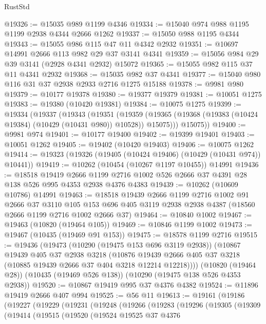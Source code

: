 \begin{lexlean}{RustStd}
\begin{coremodule}
{\begin{coremodule}
{{{{{{{{{{{{{{{{{{{{{{{{{{{{{{{{{{{{{{{{{{{{{{{{{{{{{{{{{{{{{{{{{{{{{{{{{{{{{{@19326 := @15035 @989 @1199 @4346
@19334 := @15040 @974 @988 @1195 @1199 @2938 @4344 @2666 @1262
@19337 := @15050 @988 @1195 @4344
@19343 := @15055 @986 @115 @47 @11 @4342 @2932
@19351 := @10697 @14991 @2666 @113 @982 @29 @37 @3141 @4341
@19359 := @15056 @984 @29 @39 @3141 (@2928 @4341 @2932) @15072
@19365 := @15055 @982 @115 @37 @11 @4341 @2932
@19368 := @15035 @982 @37 @4341
@19377 := @15040 @980 @116 @31 @37 @2938 @2933 @2716 @1275 @15188
@19378 := @9981 @980
@19379 := @10177 @19378
@19380 := @19377 @19379
@19381 := @10051 @1275
@19383 := @19380 (@10420 @19381)
@19384 := @10075 @1275
@19399 := @19334
    (@19337
      (@19343
        (@19351
          (@19359 (@19365 (@19368 (@19383 (@10424 @19384) (@10429 (@10431 @980)) @10528)) @15075)))
        @15075))
@19400 := @9981 @974
@19401 := @10177 @19400
@19402 := @19399 @19401
@19403 := @10051 @1262
@19405 := @19402 (@10420 @19403)
@19406 := @10075 @1262
@19414 := @19323 (@19326 (@19405 (@10424 @19406) (@10429 (@10431 @974)) @10441))
@19419 := @10262 (@10454 (@10267 @1197 @10455)) @14991
@19436 := @18518
    @19419
    @2666
    @1199
    @2716
    @1002
    @526
    @2666
    @37
    @4391
    @28
    @138
    @526
    @995
    @4353
    @2938
    @4376
    @4383
@19439 := @10262 (@10609 @10786) @14991
@19463 := @18518
    @19439
    @2666
    @1199
    @2716
    @1002
    @91
    @2666
    @37
    @3110
    @105
    @153
    @696
    @405
    @3119
    @2938
    @2938
    @4387
    (@18560 @2666 @1199 @2716 @1002 @2666 @37)
@19464 := @10840 @1002
@19467 := @19463 (@10820 (@19464 @105))
@19469 := @10846 @1199 @1002
@19473 := @19467 (@10435 (@19469 @91 @153))
@19475 := @18578 @1199 @2716
@19515 := @19436
    (@19473
      (@10290 (@19475 @153 @696 @3119 @2938))
      (@10867
        @19439
        @405
        @37
        @2938
        @3218
        (@10876 @19439 @2666 @405 @37 @3218 (@10885 @19439 @2666 @37 @404 @3218 @12214 @12218))))
    (@10820 (@19464 @28))
    (@10435 (@19469 @526 @138))
    (@10290 (@19475 @138 @526 @4353 @2938))
@19520 := @10867 @19419 @995 @37 @4376 @4382
@19524 := @11896 @19419 @2666 @407 @994
@19525 := @56 @11
@19613 := @19161
    (@19186
      (@19227
        (@19229
          (@19231
            (@19248
              (@19266
                (@19283
                  (@19296
                    (@19305
                      (@19309
                        (@19414
                          (@19515
                            (@19520
                              (@19524
                                @19525
                                @37
                                @4376
}}}}}}}}}}}}}}}}}}}}}}}}}}}}}}}}}}}}}}}}}}}}}}}}}}}}}}}}}}}}}}}}}}}}}}}}}}}}}}
\end{coremodule}}
\end{coremodule}
\end{lexlean}
